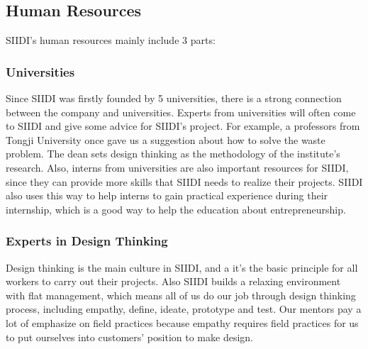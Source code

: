 \documentclass[12pt]{article}
\begin{document}
\subsection{Human Resources}
\par SIIDI's human resources mainly include 3 parts:
\subsubsection{Universities}
Since SIIDI was firstly founded by 5 universities, there is a strong connection between the company and universities. Experts from universities will often come to SIIDI and give some advice for SIIDI's project.  For example, a professors from Tongji University once gave us a suggestion about how to solve the waste problem. The dean sets design thinking as the methodology of the institute's research. Also, interns from universities are also important resources for SIIDI, since they can provide more skills that SIIDI needs to realize their projects. SIIDI also uses this way to help interns to gain practical experience during their internship, which is a good way to help the education about entrepreneurship.
\subsubsection{Experts in Design Thinking}
Design thinking is the main culture in SIIDI, and a it's the basic principle for all workers to carry out their projects. Also SIIDI builds a relaxing environment with flat management, which means all of us do our job through design thinking process, including empathy, define, ideate, prototype and test. Our mentors pay a lot of emphasize on field practices because empathy requires field practices for us to put ourselves into customers' position to make design.
\end{document}
